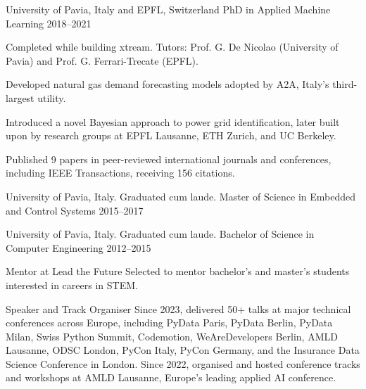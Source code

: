 \documentclass[10pt,a4paper]{article}
\begin{document}
\begin{cventries}
  \cventry
    {University of Pavia, Italy and EPFL, Switzerland}
    {PhD in Applied Machine Learning}
    {}
    {2018--2021}
    {Completed while building xtream. Tutors: Prof. G. De Nicolao (University of Pavia) and Prof. G. Ferrari-Trecate (EPFL).
      \begin{cvitems}
        \item Developed natural gas demand forecasting models adopted by A2A, Italy's third-largest utility.
        \item Introduced a novel Bayesian approach to power grid identification, later built upon by research groups at EPFL Lausanne, ETH Zurich, and UC Berkeley.
        \item Published 9 papers in peer-reviewed international journals and conferences, including IEEE Transactions, receiving 156 citations.
      \end{cvitems}}

  \cventry
    {University of Pavia, Italy. Graduated cum laude.}
    {Master of Science in Embedded and Control Systems}
    {}
    {2015--2017}
    {}

  \cventry
    {University of Pavia, Italy. Graduated cum laude.}
    {Bachelor of Science in Computer Engineering}
    {}
    {2012--2015}
    {}
\end{cventries}

\begin{cventries}
  \cventry
    {}
    {Mentor at Lead the Future}
    {}
    {}
    {Selected to mentor bachelor's and master's students interested in careers in STEM.}

  \cventry
    {}
    {Speaker and Track Organiser}
    {}
    {}
    {Since 2023, delivered 50+ talks at major technical conferences across Europe, including PyData Paris, PyData Berlin, PyData Milan, Swiss Python Summit, Codemotion, WeAreDevelopers Berlin, AMLD Lausanne, ODSC London, PyCon Italy, PyCon Germany, and the Insurance Data Science Conference in London. Since 2022, organised and hosted conference tracks and workshops at AMLD Lausanne, Europe's leading applied AI conference.}
\end{cventries}

\begin{cvparagraph}
\\
\\
\\
\\
\end{cvparagraph}
\end{document}
